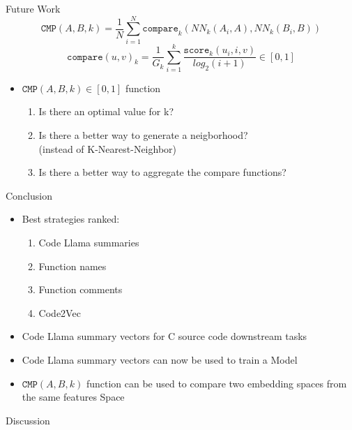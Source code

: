 \documentclass[aspectratio=1610,12pt]{beamer}
\begin{document}
\begin{frame}{Future Work}
    \[
    \texttt{CMP}(A,B,k) = \frac{1}{N}\sum_{i = 1}^{N}
      \texttt{compare}_k(NN_k(A_i,A),NN_k(B_i, B))
    \]
    \[
    \texttt{compare}(u,v)_k = 
      \frac{1}{G_k} \sum^{k}_{i=1} 
      \frac{ \texttt{score}_{k}(u_i,i,v)}{log_2(i+1)} 
      \in [0,1]
    \]
  \begin{itemize}
  \item $\texttt{CMP}(A,B,k) \in [0,1] $ function
    \begin{enumerate}
      \item Is there an optimal value for k?
      \item Is there a better way to generate a neigborhood?\\
        (instead of K-Nearest-Neighbor)
      \item Is there a better way to aggregate the compare functions?
    \end{enumerate}
  \end{itemize}
\end{frame}

\begin{frame}{Conclusion}
  \begin{itemize}
    \item Best strategies ranked: 
    \begin{enumerate}
      \item Code Llama summaries
      \item Function names
      \item Function comments
      \item Code2Vec
    \end{enumerate}
    \item Code Llama summary vectors for 
      C source code downstream tasks
    \item Code Llama summary vectors can now 
      be used to train a Model
  \item $\texttt{CMP}(A,B,k)$ function
    can be used to compare two embedding 
    spaces from the same features Space
  \end{itemize}
\end{frame}

\appendix

\begin{frame}{Discussion}
\end{frame}
\end{document}
